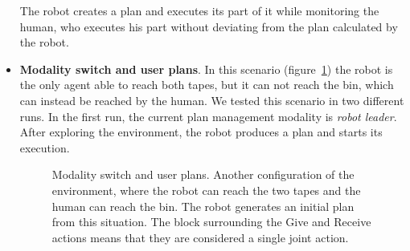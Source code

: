 \begin{itemize}
The robot creates a plan and executes its part of it while monitoring the human,
who executes his part without deviating from the plan calculated by
the robot.

\item
\textbf{Modality switch and user plans}.
In this scenario (figure~\ref{fig:coworker_results_scenario2}) the robot is the only agent able to reach both tapes, but it can not reach
the bin, which can instead be reached by the human. We tested
this scenario in two different runs. In the first run, the current plan management modality is \textit{robot leader}.
After exploring the environment, the robot produces a plan and starts its execution.

\begin{figure}
  \centering
  \caption[Robot coworker experiment 2]{Modality switch and user plans. Another configuration of
    the environment, where the robot can reach the two tapes and the
    human can reach the bin. The robot generates an initial plan
  from this situation. The block surrounding the Give and Receive
  actions means that they are considered a single joint action.}
  \centering
  \label{fig:coworker_results_scenario2}
\end{figure}


\end{itemize}
